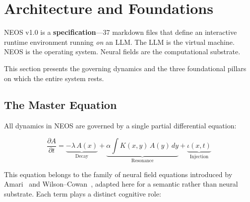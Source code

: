 \section{Architecture and Foundations}\label{sec:architecture}

NEOS v1.0 is a \textbf{specification}---37 markdown files that define
an interactive runtime environment running \emph{on} an LLM.  The LLM
is the virtual machine.  NEOS is the operating system.  Neural fields
are the computational substrate.

This section presents the governing dynamics and the three
foundational pillars on which the entire system rests.

\subsection{The Master Equation}\label{sec:master-equation}

All dynamics in NEOS are governed by a single partial differential
equation:

\begin{eqbox}
\begin{equation}\label{eq:master-pde}
\frac{\partial A}{\partial t}
  = \underbrace{-\lambda\, A(x)}_{\text{Decay}}
  + \underbrace{\alpha \int K(x,y)\, A(y)\, dy}_{\text{Resonance}}
  + \underbrace{\iota(x,t)}_{\text{Injection}}
\end{equation}
\end{eqbox}

\noindent
This equation belongs to the family of neural field
equations introduced by Amari~\cite{amari1977dynamics} and
Wilson--Cowan~\cite{wilson1972excitatory}, adapted here for a semantic
rather than neural substrate.  Each term plays a distinct cognitive
role:

